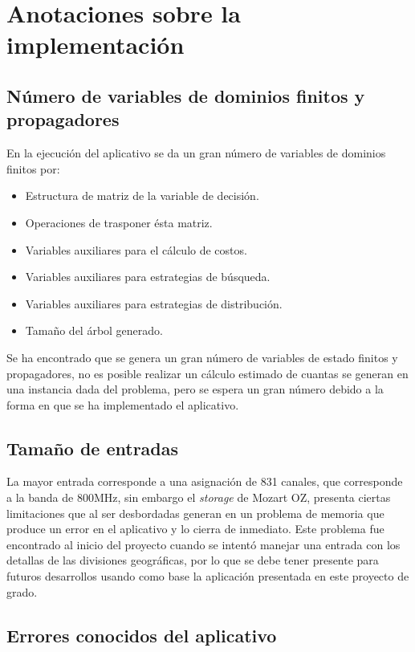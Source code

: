 \section{Anotaciones sobre la implementación}

\subsection{Número de variables de dominios finitos y propagadores}

En la ejecución del aplicativo se da un gran número de variables de dominios finitos por:

\begin{itemize}
	\item Estructura de matriz de la variable de decisión.
	\item Operaciones de trasponer ésta matriz.
	\item Variables auxiliares para el cálculo de costos.
	\item Variables auxiliares para estrategias de búsqueda.
	\item Variables auxiliares para estrategias de distribución.
	\item Tamaño del árbol generado.
\end{itemize}

Se ha encontrado que se genera un gran número de variables de estado finitos y propagadores, no es posible realizar un cálculo estimado de cuantas se generan en una instancia dada del problema, pero se espera un gran número debido a la forma en que se ha implementado el aplicativo.

\subsection{Tamaño de entradas}

La mayor entrada corresponde a una asignación de 831 canales, que corresponde a la banda de 800MHz, sin embargo el \textit{storage} de Mozart OZ, presenta ciertas limitaciones que al ser desbordadas generan en un problema de memoria que produce un error en el aplicativo y lo cierra de inmediato.
Este problema fue encontrado al inicio del proyecto cuando se intentó manejar una entrada con los detallas de las divisiones geográficas, por lo que se debe tener presente para futuros desarrollos usando como base la aplicación presentada en este proyecto de grado.

\subsection{Errores conocidos del aplicativo}

